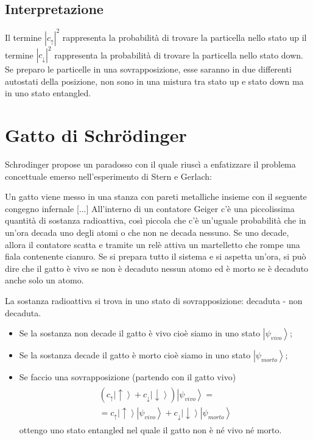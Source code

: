 \subsection{Interpretazione}
Il termine $\left|c_{\uparrow}\right|^2$ rappresenta la probabilità di trovare la particella nello stato up
il termine $\left|c_{\downarrow}\right|^2$ rappresenta la probabilità di trovare la particella nello stato down. Se preparo le particelle in una sovrapposizione, esse saranno in due differenti autostati della posizione, non sono in una mistura tra stato up e stato down ma in uno stato entangled.

\section{Gatto di Schrödinger} %
Schrodinger propose un paradosso con il quale riuscì a enfatizzare il problema concettuale emerso nell'esperimento di Stern e Gerlach:

Un gatto viene messo in una stanza con pareti metalliche insieme con il seguente congegno infernale [...] All'interno di un contatore Geiger c'è una piccolissima quantità di sostanza radioattiva, così piccola che c'è un'uguale probabilità che in un'ora decada uno degli atomi o che non ne decada nessuno. Se uno decade, allora il contatore scatta e tramite un relè attiva un martelletto che rompe una fiala contenente cianuro. Se si prepara tutto il sistema e si aspetta un'ora, si può dire che il gatto è vivo se non è decaduto nessun atomo ed è morto se è decaduto anche solo un atomo.

La sostanza radioattiva si trova in uno stato di sovrapposizione: decaduta - non decaduta.
\begin{itemize}
\item Se la sostanza non decade il gatto è vivo cioè siamo in uno stato $\left|\psi_{vivo}\right\rangle$;
\item Se la sostanza decade il gatto è morto cioè siamo in uno stato $\left|\psi_{morto}\right\rangle$;
\item Se faccio una sovrapposizione (partendo con il gatto vivo)
\begin{equation}\begin{split}\begin{split}
(c_{\uparrow}\left|\uparrow\right\rangle + c_{\downarrow}\left|\downarrow\right\rangle)\left|\psi_{vivo}\right\rangle=\\
=c_{\uparrow}\left|\uparrow\right\rangle\left|\psi_{vivo}\right\rangle + c_{\downarrow}\left|\downarrow\right\rangle\left|\psi_{morto}\right\rangle
\end{split}\end{split}\end{equation}
ottengo uno stato entangled nel quale il gatto non è né vivo né morto.
\end{itemize}

